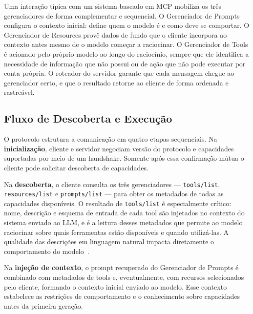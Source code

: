 \documentclass[12pt]{article}
\begin{document}
Uma interação típica com um sistema baseado em MCP mobiliza os três
gerenciadores de forma complementar e sequencial. O Gerenciador de
Prompts configura o contexto inicial: define quem o modelo é e como deve
se comportar. O Gerenciador de Resources provê dados de fundo que o
cliente incorpora ao contexto antes mesmo de o modelo começar a
raciocinar. O Gerenciador de Tools é acionado pelo próprio modelo ao
longo do raciocínio, sempre que ele identifica a necessidade de informação
que não possui ou de ação que não pode executar por conta própria. O
roteador do servidor garante que cada mensagem chegue ao gerenciador certo,
e que o resultado retorne ao cliente de forma ordenada e rastreável.

\subsection{Fluxo de Descoberta e Execução}
\label{subsec:fluxo}

O protocolo estrutura a comunicação em quatro etapas sequenciais. Na
\textbf{inicialização}, cliente e servidor negociam versão do protocolo
e capacidades suportadas por meio de um handshake. Somente após essa
confirmação mútua o cliente pode solicitar descoberta de capacidades.

Na \textbf{descoberta}, o cliente consulta os três gerenciadores ---
\texttt{tools/list}, \texttt{resources/list} e \texttt{prompts/list} ---
para obter os metadados de todas as capacidades disponíveis. O resultado
de \texttt{tools/list} é especialmente crítico: nome, descrição e
esquema de entrada de cada tool são injetados no contexto do sistema
enviado ao LLM, e é a leitura desses metadados que permite ao modelo
raciocinar sobre quais ferramentas estão disponíveis e quando utilizá-las.
A qualidade das descrições em linguagem natural impacta diretamente o
comportamento do modelo~\cite{mcp2025tools}.

Na \textbf{injeção de contexto}, o prompt recuperado do Gerenciador de
Prompts é combinado com metadados de tools e, eventualmente, com recursos
selecionados pelo cliente, formando o contexto inicial enviado ao modelo.
Esse contexto estabelece as restrições de comportamento e o conhecimento
sobre capacidades antes da primeira geração.
\end{document}
